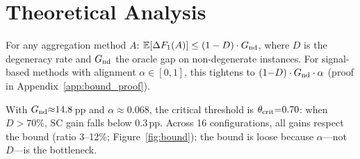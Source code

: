 \section{Theoretical Analysis}\label{sec:theory}

\begin{theorem}\label{thm:degeneracy_bound}
For any aggregation method $A$: $\mathbb{E}[\Delta F_1(A)] \leq (1 - D) \cdot G_{\textup{nd}}$,
where $D$ is the degeneracy rate and $G_{\textup{nd}}$ the oracle gap on non-degenerate instances.
For signal-based methods with alignment $\alpha \in [0,1]$, this tightens to $(1{-}D) \cdot G_{\textup{nd}} \cdot \alpha$ (proof in Appendix~\ref{app:bound_proof}).
\end{theorem}

\noindent With $G_{\textup{nd}}{\approx}14.8$\,pp and $\alpha{\approx}0.068$, the critical threshold is $\theta_{\textup{crit}}{=}0.70$: when $D{>}70$\%, SC gain falls below $0.3$\,pp.
Across 16 configurations, all gains respect the bound (ratio 3--12\%; Figure~\ref{fig:bound}); the bound is loose because $\alpha$---not $D$---is the bottleneck.
